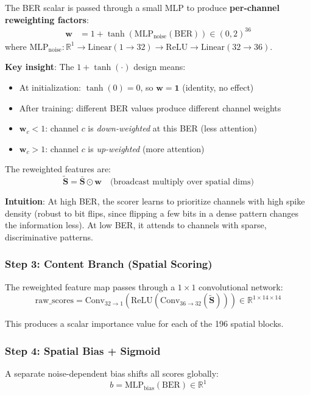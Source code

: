 \documentclass[11pt]{article}
\begin{document}
The BER scalar is passed through a small MLP to produce \textbf{per-channel reweighting factors}:
\begin{align}
    \mathbf{w} &= 1 + \tanh(\text{MLP}_{\text{noise}}(\text{BER})) \in (0, 2)^{36}
\end{align}
where $\text{MLP}_{\text{noise}}: \mathbb{R}^1 \to \text{Linear}(1 \to 32) \to \text{ReLU} \to \text{Linear}(32 \to 36)$.

\textbf{Key insight}: The $1 + \tanh(\cdot)$ design means:
\begin{itemize}[nosep]
    \item At initialization: $\tanh(0) = 0$, so $\mathbf{w} = \mathbf{1}$ (identity, no effect)
    \item After training: different BER values produce different channel weights
    \item $\mathbf{w}_c < 1$: channel $c$ is \emph{down-weighted} at this BER (less attention)
    \item $\mathbf{w}_c > 1$: channel $c$ is \emph{up-weighted} (more attention)
\end{itemize}

The reweighted features are:
\[
\tilde{\mathbf{S}} = \bar{\mathbf{S}} \odot \mathbf{w}  \quad \text{(broadcast multiply over spatial dims)}
\]

\textbf{Intuition}: At high BER, the scorer learns to prioritize channels with high spike density (robust to bit flips, since flipping a few bits in a dense pattern changes the information less). At low BER, it attends to channels with sparse, discriminative patterns.

\subsubsection{Step 3: Content Branch (Spatial Scoring)}

The reweighted feature map passes through a $1{\times}1$ convolutional network:
\[
\text{raw\_scores} = \text{Conv}_{32 \to 1}(\text{ReLU}(\text{Conv}_{36 \to 32}(\tilde{\mathbf{S}}))) \in \mathbb{R}^{1 \times 14 \times 14}
\]

This produces a scalar importance value for each of the 196 spatial blocks.

\subsubsection{Step 4: Spatial Bias + Sigmoid}

A separate noise-dependent bias shifts all scores globally:
\[
b = \text{MLP}_{\text{bias}}(\text{BER}) \in \mathbb{R}^1
\]
\end{document}

